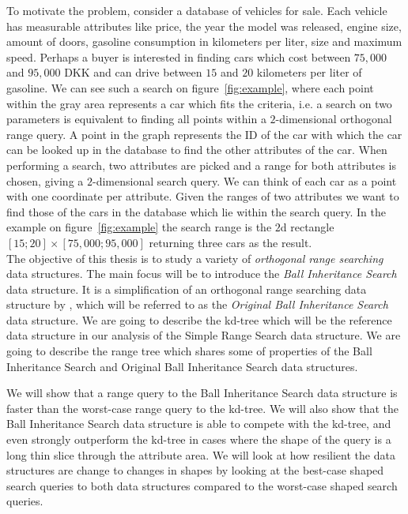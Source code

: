 \noindent To motivate the problem, consider a database of vehicles for sale. Each vehicle has measurable attributes like price, the year the model was released, engine size, amount of doors, gasoline consumption in kilometers per liter, size  and maximum speed. Perhaps a buyer is interested in finding cars which cost between $75,000$ and $95,000$ DKK and can drive between $15$ and $20$ kilometers per liter of gasoline. We can see such a search on figure~\ref{fig:example}, where each point within the gray area represents a car which fits the criteria, i.e. a search on two parameters is equivalent to finding all points within a $2$-dimensional orthogonal range query. A point in the graph represents the ID of the car with which the car can be looked up in the database to find the other attributes of the car. When performing a search, two attributes are picked and a range for both attributes is chosen, giving a $2$-dimensional search query. We can think of each car as a point with one coordinate per attribute. Given the ranges of two attributes we want to find those of the cars in the database which lie within the search query. In the example on figure~\ref{fig:example} the search range is the $2$d rectangle $[15;20] \times [75,000;95,000]$ returning three cars as the result. \\

The objective of this thesis is to study a variety of \emph{orthogonal range searching} data structures. The main focus will be to introduce the \emph{Ball Inheritance Search} data structure. It is a simplification of an orthogonal range searching data structure by \citet{chanetal}, which will be referred to as the \emph{Original Ball Inheritance Search} data structure. We are going to describe the kd-tree which will be the reference data structure in our analysis of the Simple Range Search data structure. We are going to describe the range tree which shares some of properties of the Ball Inheritance Search and Original Ball Inheritance Search data structures.

We will show that a range query to the Ball Inheritance Search data structure is faster than the worst-case range query to the kd-tree. We will also show that the Ball Inheritance Search data structure is able to compete with the kd-tree, and even strongly outperform the kd-tree in cases where the shape of the query is a long thin slice through the attribute area. We will look at how resilient the data structures are change to changes in shapes by looking at the best-case shaped search queries to both data structures compared to the worst-case shaped search queries. \\ 


